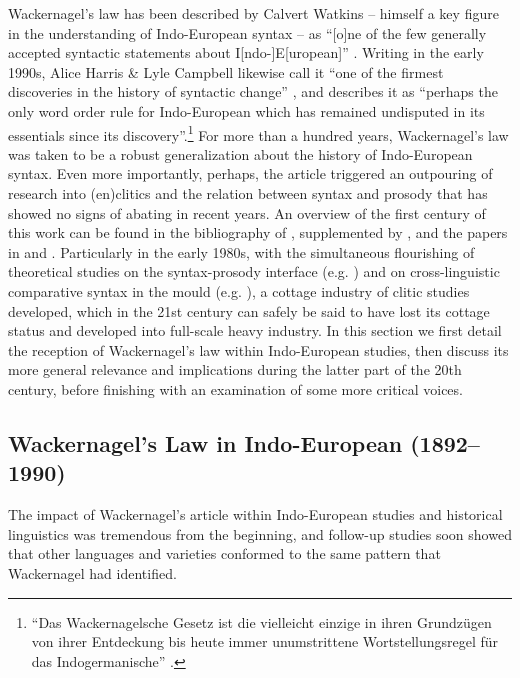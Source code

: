 Wackernagel's law has been described by Calvert Watkins -- himself a key figure in the understanding of Indo-European syntax -- as ``[o]ne of the few generally accepted syntactic statements about I[ndo-]E[uropean]'' \citep[1036]{Watkins1964}. Writing in the early 1990s, Alice Harris \& Lyle Campbell likewise call it ``one of the firmest discoveries in the history of syntactic change'' \citep[29]{HarrisCampbell1995}, and \citet{Krisch1990} describes it as ``perhaps the only word order rule for Indo-European which has remained undisputed in its essentials since its discovery''.\footnote{``Das Wackernagelsche Gesetz ist die vielleicht einzige in ihren Grundzügen von ihrer Entdeckung bis heute immer unumstrittene Wortstellungsregel für das Indogermanische'' \citep[64--65]{Krisch1990}.} For more than a hundred years, Wackernagel's law was taken to be a robust generalization about the history of Indo-European syntax. Even more importantly, perhaps, the article triggered an outpouring of research into (en)clitics and the relation between syntax and prosody that has showed no signs of abating in recent years. An overview of the first century of this work can be found in the bibliography of \citet{NevisEtal1994}, supplemented by \citet{Janse1994}, and the papers in \citet{EichnerRix1990} and \citet{HalpernZwicky1996}. Particularly in the early 1980s, with the simultaneous flourishing of theoretical studies on the syntax-prosody interface (e.g. \citealp{Klavans1982,Kaisse1985,Selkirk1984,Selkirk1986,NesporVogel1986})
and on cross-linguistic comparative syntax in the  mould (e.g. \citealp{Chomsky1981,Rizzi1982,Hale1983}), a cottage industry of clitic studies developed, which in the 21st century can safely be said to have lost its cottage status and developed into full-scale heavy industry. In this section we first detail the reception of Wackernagel's law within Indo-European studies, then discuss its more general relevance and implications during the latter part of the 20th century, before finishing with an examination of some more critical voices.

\subsection{Wackernagel's Law in Indo-European (1892--1990)}

The impact of Wackernagel's article within Indo-European studies and historical linguistics was tremendous from the beginning, and follow-up studies soon showed that other languages and varieties conformed to the same pattern that Wackernagel had identified. 

